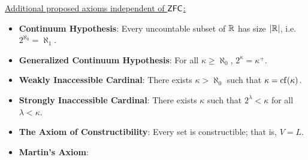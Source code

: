 \documentclass{amsart}
\DeclareMathOperator{\ZFC}{\sf{ZFC}}
\DeclareMathOperator{\cf}{\rm{cf}}
\begin{document}
	\newpage 
	
	\underline{Additional proposed axioms independent of $\ZFC$:}
	\begin{itemize}
		\item \textbf{Continuum Hypothesis}: Every uncountable subset of $\mathbb{R}$ has size $|\mathbb{R}|$, i.e. $2^{\aleph_0}=\aleph_1$.
		\item \textbf{Generalized Continuum Hypothesis}: For all $\kappa\geq \aleph_0$, $2^{\kappa}=\kappa^+$.
		\item \textbf{Weakly Inaccessible Cardinal}: There exists $\kappa>\aleph_0$ such that $\kappa=\cf(\kappa)$.
		\item \textbf{Strongly Inaccessible Cardinal}: There exists $\kappa$ such that $2^{\lambda}<\kappa$ for all $\lambda <\kappa$.
		\item \textbf{The Axiom of Constructibility}: Every set is constructible; that is, $V=L$.
		\item \textbf{Martin's Axiom}: 
	\end{itemize}
	
	\newpage
	
\end{document}
